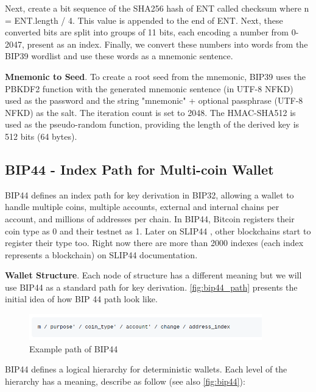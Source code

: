 Next, create a bit sequence of the SHA256 hash of ENT called checksum where n = ENT.length / 4. This value is appended to the end of ENT. Next, these converted bits are split into groups of 11 bits, each encoding a number from 0-2047, present as an index. Finally, we convert these numbers into words from the BIP39 wordlist and use these words as a mnemonic sentence.

\bigskip
{\textbf{Mnemonic to Seed}}. To create a root seed from the mnemonic, BIP39 uses the PBKDF2 function with the generated mnemonic sentence (in UTF-8 NFKD) used as the password and the string "mnemonic" + optional passphrase (UTF-8 NFKD) as the salt. The iteration count is set to 2048. The HMAC-SHA512 is used as the pseudo-random function, providing the length of the derived key is 512 bits (64 bytes).


\subsection{BIP44 - Index Path for Multi-coin Wallet}
BIP44 \cite{bip44} defines an index path for key derivation in BIP32, allowing a wallet to handle multiple coins, multiple accounts, external and internal chains per account, and millions of addresses per chain. In BIP44, Bitcoin registers their coin type as 0 and their testnet as 1. Later on SLIP44 \cite{slip44}, other blockchains start to register their type too. Right now there are more than 2000 indexes (each index represents a blockchain) on SLIP44 documentation.

\bigskip
{\textbf{Wallet Structure}}. Each node of structure has a different meaning but we will use BIP44 as a standard path for key derivation. \autoref{fig:bip44_path} presents the initial idea of how BIP 44 path look like.

\begin{figure}[ht!]
    \centering
    \includegraphics[width=0.9\textwidth]{images/bip44_path.png}
    \caption[Example path of BIP44]{Example path of BIP44}
    \label{fig:bip44_path}
\end{figure}

BIP44 defines a logical hierarchy for deterministic wallets. Each level of the hierarchy has a meaning, describe as follow (see also \autoref{fig:bip44}):

